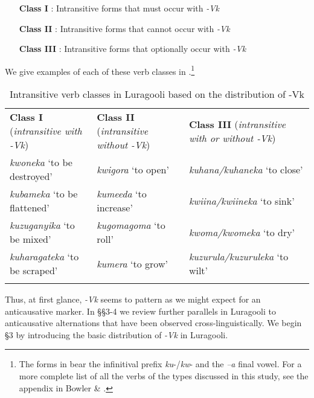 \documentclass[output=paper]{langsci/langscibook}
\begin{document}
\begin{itemize}
     \item[\textbf{  Class I}]: Intransitive forms that must occur with \textit{-Vk}\\
     \item[\textbf{  Class II}]: Intransitive forms that cannot occur with \textit{-Vk}\\
     \item[\textbf{  Class III}]: Intransitive forms that optionally occur with \textit{-Vk}\\
\end{itemize}

     
We give examples of each of these verb classes in .\footnote{The forms in  bear the infinitival prefix \textit{ku}-/\textit{kw}- and the \textit{–a} final vowel. For a more complete list of all the verbs of the types discussed in this study, see the appendix in Bowler \& \citet{Gluckman2015}.}

\begin{table}
\caption{Intransitive verb classes in Luragooli based on the distribution of -Vk}
\label{tab:1}

\begin{tabularx}{\textwidth}{XXX}
\lsptoprule

\textbf{Class I} (\textit{intransitive with -Vk}) & \textbf{Class II} (\textit{intransitive without -Vk}) & \textbf{Class III} (\textit{intransitive with or without -Vk})\\
\textit{kwoneka} ‘to be destroyed’ & \textit{kwigora} ‘to open’ & \textit{kuhana/kuhaneka} ‘to close’\\
\textit{kubameka} ‘to be flattened’ & \textit{kumeeda} ‘to increase’ & \textit{kwiina/kwiineka} ‘to sink’\\
\textit{kuzuganyika} ‘to be mixed’ & \textit{kugomagoma} ‘to roll’ & \textit{kwoma/kwomeka} ‘to dry’\\
\textit{kuharagateka} ‘to be scraped’ & \textit{kumera} ‘to grow’ & \textit{kuzurula/kuzuruleka} ‘to wilt’\\
\lspbottomrule
\end{tabularx}
\end{table}


Thus, at first glance, \textit{-Vk }seems to pattern as we might expect for an anticausative marker. In §§3-4 we review further parallels in Luragooli to anticausative alternations that have been observed cross-linguistically. We begin §3 by introducing the basic distribution of \textit{-Vk} in Luragooli.
\end{document}
